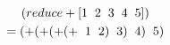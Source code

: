 \documentclass{article}
\begin{document}
\begin{gather*}
    (reduce + [1 \hspace*{.2cm} 2 \hspace*{.2cm} 3 \hspace*{.2cm} 4 \hspace*{.2cm} 5]) \\
    = (+ (+ (+ (+ \hspace*{.2cm} 1 \hspace*{.2cm} 2) \hspace*{.2cm} 3) \hspace*{.2cm} 4) \hspace*{.2cm} 5)
\end{gather*}
\end{document}
